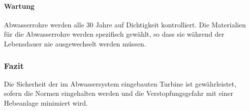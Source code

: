 \paragraph{Wartung}
Abwasserrohre werden alle 30 Jahre auf Dichtigkeit kontrolliert. Die Materialien für die Abwasserrohre werden spezifisch gewählt, so dass sie während der Lebensdauer nie ausgewechselt werden müssen.

\subsubsection{Fazit}

Die Sicherheit der im Abwassersystem eingebauten Turbine ist gewährleistet, sofern die Normen eingehalten werden und die Verstopfungsgefahr mit einer Hebeanlage minimiert wird. 

\clearpage 





